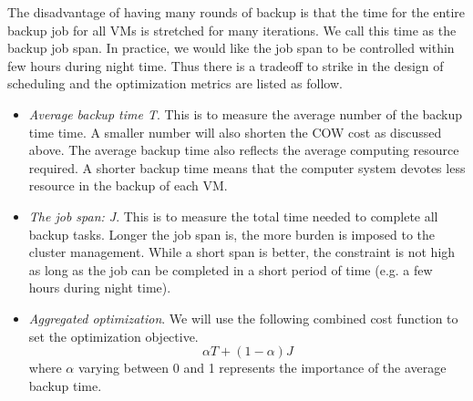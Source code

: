 The disadvantage of having many rounds of backup is that the time for  the entire
backup job for all VMs is stretched for many iterations.
We call this time as the backup job span.
In practice, we would like the job span to be controlled within few hours during
night time. Thus there is a tradeoff to strike in the design of scheduling and
the optimization  metrics are listed as follow.
\begin{itemize}
\item {\em Average backup time T}.
This is to measure the average number of the backup time time. 
A smaller number will also shorten the COW cost as discussed above.
The average backup time also reflects the average computing resource required.
A shorter backup time means that the computer system devotes less resource in the backup of each VM. 
\item {\em The job span: J}.
This is to measure the total time needed to complete all backup tasks.
Longer the job span is, the more burden is imposed to the cluster management.
While a short span is better, the  constraint is not high as long as the job can be completed
in a short period of time (e.g. a few hours during night time). 

\item {\em Aggregated optimization}.
We will use the following combined cost function to set the optimization objective.
\[
\alpha T + (1-\alpha) J
\]
where $\alpha$ varying between 0 and 1 represents the importance of the average backup time.
\end{itemize}


